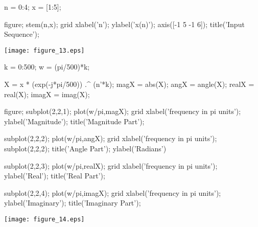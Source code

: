 \documentclass[12pt, onecolumn]{IEEEtran}
\begin{document}
	\begin{matlabcode}
		n = 0:4; 
		x = [1:5];
		
		figure; stem(n,x); grid
		xlabel('n'); ylabel('x(n)');
		axis([-1 5 -1 6]); title('Input Sequence');
	\end{matlabcode}
	\begin{center}
		\texttt{[image: figure\_13.eps]}
	\end{center}
	\begin{matlabcode}
		
		k = 0:500; %
		w = (pi/500)*k;  
		
		X = x * (exp(-j*pi/500)) .^ (n'*k); %
		magX = abs(X); angX = angle(X);
		realX = real(X); imagX = imag(X);
		
		figure; subplot(2,2,1); plot(w/pi,magX); grid
		xlabel('frequency in pi units'); ylabel('Magnitude');
		title('Magnitude Part'); 
		
		subplot(2,2,2); plot(w/pi,angX); grid
		xlabel('frequency in pi units'); subplot(2,2,2); 
		title('Angle Part'); ylabel('Radians')
		
		subplot(2,2,3); plot(w/pi,realX); grid
		xlabel('frequency in pi units');  ylabel('Real');
		title('Real Part');
		
		subplot(2,2,4); plot(w/pi,imagX); grid
		xlabel('frequency in pi units'); ylabel('Imaginary');
		title('Imaginary Part'); 
	\end{matlabcode}
	\begin{center}
		\texttt{[image: figure\_14.eps]}
	\end{center}
	
	\begin{par}
		\begin{flushleft}
		\end{flushleft}
	\end{par}
	
\end{document}
